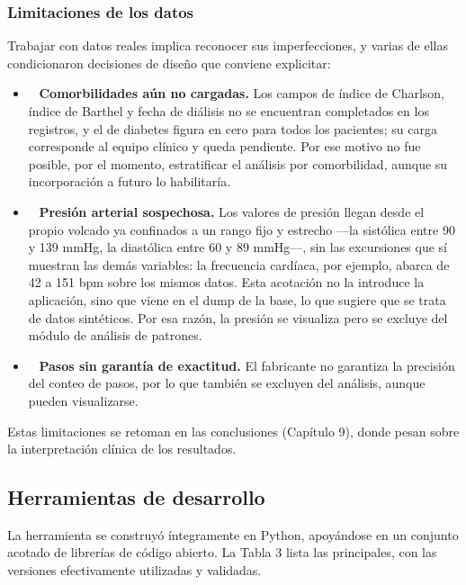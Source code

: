 \subsubsection{Limitaciones de los datos}
Trabajar con datos reales implica reconocer sus imperfecciones, y varias de ellas condicionaron decisiones de diseño que conviene explicitar:\\


\begin{itemize}
\item~ \textbf{Comorbilidades aún no cargadas.} Los campos de índice de Charlson, índice de Barthel y fecha de diálisis no se encuentran completados en los registros, y el de diabetes figura en cero para todos los pacientes; su carga corresponde al equipo clínico y queda pendiente. Por ese motivo no fue posible, por el momento, estratificar el análisis por comorbilidad, aunque su incorporación a futuro lo habilitaría.
\item~ \textbf{Presión arterial sospechosa.} Los valores de presión llegan desde el propio volcado ya confinados a un rango fijo y estrecho —la sistólica entre 90 y 139 mmHg, la diastólica entre 60 y 89 mmHg—, sin las excursiones que sí muestran las demás variables: la frecuencia cardíaca, por ejemplo, abarca de 42 a 151 bpm sobre los mismos datos. Esta acotación no la introduce la aplicación, sino que viene en el dump de la base, lo que sugiere que se trata de datos sintéticos. Por esa razón, la presión se visualiza pero se excluye del módulo de análisis de patrones.
\item~ \textbf{Pasos sin garantía de exactitud.} El fabricante no garantiza la precisión del conteo de pasos, por lo que también se excluyen del análisis, aunque pueden visualizarse.
\end{itemize}
Estas limitaciones se retoman en las conclusiones (Capítulo 9), donde pesan sobre la interpretación clínica de los resultados.\\


\subsection{Herramientas de desarrollo}
La herramienta se construyó íntegramente en Python, apoyándose en un conjunto acotado de librerías de código abierto. La Tabla 3 lista las principales, con las versiones efectivamente utilizadas y validadas.\\


